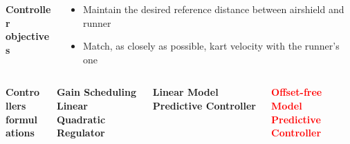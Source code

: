 \documentclass[9pt, aspectratio=169]{beamer}
\begin{document}
\begin{frame}[t]
\vspace{-0.2cm}
\begin{columns}
\begin{column}{0.15\textwidth}
\begin{block}{}
\centering
\textbf{\small{Controller \\ objectives}}
\end{block}
\end{column}
\begin{column}{0.82\textwidth}
\begin{block}{}
\begin{itemize}
	\footnotesize
	\item[$\blacktriangleright$]<3-> Maintain the desired reference distance between airshield and runner
	\item[$\blacktriangleright$]<4-> Match, as closely as possible, kart velocity with the runner's one
\end{itemize}
\end{block}
\end{column}
\end{columns}

\vspace{-0.2cm}
\begin{columns}
\begin{column}{0.15\textwidth}
\begin{block}{}
\centering
\textbf{\small{Controllers \\ formulations}}
\end{block}
\end{column}
\begin{column}{0.22\textwidth}
\begin{block}{}
\centering
\textcolor{emph@Thesis}{\textbf{Gain Scheduling \\ Linear Quadratic Regulator}}
\end{block}
\end{column}
\hspace{-0.4cm}
\begin{column}{0.3\textwidth}
\begin{block}{}
\centering
\textcolor{mygreen}{\textbf{Linear Model Predictive Controller}}
\end{block}
\end{column}
\hspace{-0.4cm}
\begin{column}{0.23\textwidth}
\begin{block}{}
\centering
\textcolor{red}{\textbf{Offset-free \\ Model Predictive Controller}}
\end{block}
\end{column}
\end{columns}


\end{frame}
\end{document}

